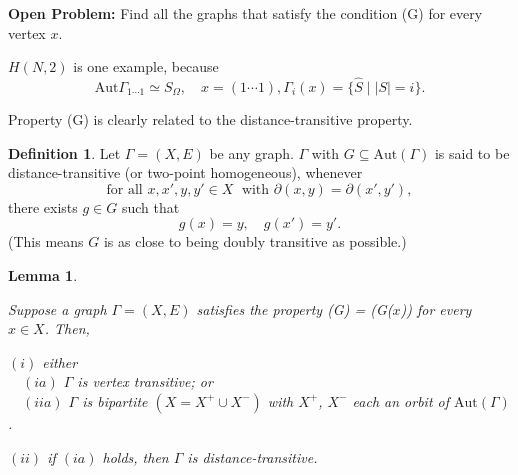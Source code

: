 \documentclass[
]{book}
\newtheorem{lemma}{Lemma}[chapter]
\theoremstyle{definition}
\newtheorem{definition}{Definition}[chapter]
\theoremstyle{definition}
\theoremstyle{definition}
\theoremstyle{definition}
\theoremstyle{remark}
\begin{document}
\textbf{Open Problem:}
Find all the graphs that satisfy the condition (G) for every vertex \(x\).

\(H(N, 2)\) is one example, because
\[\mathrm{Aut}\Gamma_{1\cdots 1} \simeq S_\Omega, \quad x = (1\cdots 1), \Gamma_i(x)
 = \{\hat{S} \mid |S| = i\}.\]

Property (G) is clearly related to the distance-transitive property.

\begin{definition}
Let \(\Gamma = (X, E)\) be any graph. \(\Gamma\) with \(G\subseteq \mathrm{Aut}(\Gamma)\) is said to be distance-transitive  (or two-point homogeneous), whenever
\[\text{for all } x, x', y, y'\in X \; \text{ with } \partial(x,y) = \partial(x',y'),\]
there exists \(g\in G\) such that
\[g(x) = y,\quad g(x') = y'.\]
(This means \(G\) is as close to being doubly transitive as possible.)
\end{definition}

\begin{lemma}
\protect\hypertarget{lem:property-g}{}\label{lem:property-g}

Suppose a graph \(\Gamma = (X, E)\) satisfies the property \textrm{(G) = (G($x$))} for every \(x\in X\). Then,

\((i)\) either\\
\(\quad (ia)\) \(\Gamma\) is vertex transitive; or\\
\(\quad (iia)\) \(\Gamma\) is bipartite \((X = X^+ \cup X^-)\) with \(X^+\), \(X^-\) each an orbit of \(\mathrm{Aut}(\Gamma)\).

\((ii)\) if \((ia)\) holds, then \(\Gamma\) is distance-transitive.

\end{lemma}
\end{document}
